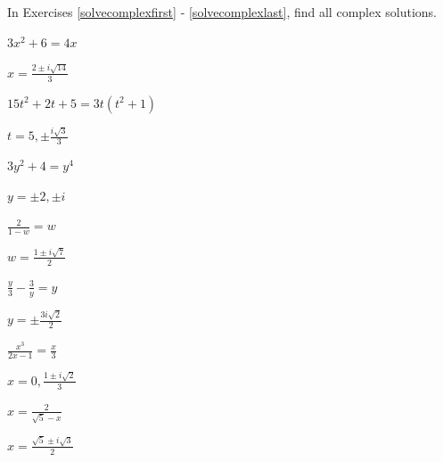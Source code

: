 \documentclass{ximera}
\begin{document}
\begin{question}

In Exercises \ref{solvecomplexfirst} - \ref{solvecomplexlast}, find all complex solutions.

\begin{problem} \label{solvecomplexfirst}
$3x^2 + 6 = 4x$

\begin{solution}
$x = \frac{2 \pm i\sqrt{14}}{3}$ 
\end{solution}
\end{problem}

\begin{problem}
$15t^2+2t+5= 3t(t^2+1)$

\begin{solution}
 $t = 5, \pm \frac{i \sqrt{3}}{3}$
\end{solution}
\end{problem}

\begin{problem}
$3y^2 + 4 = y^4$

\begin{solution}
 $y = \pm 2, \pm i$
\end{solution}
\end{problem}

\begin{problem}
$\frac{2}{1-w}= w$ 

\begin{solution}
 $w = \frac{1 \pm i \sqrt{7}}{2}$ 
\end{solution}
\end{problem}

\begin{problem}
$\frac{y}{3} - \frac{3}{y} = y$ 

\begin{solution}
$y = \pm \frac{3i \sqrt{2}}{2}$
\end{solution}
\end{problem}

\begin{problem}
$\frac{x^3}{2x-1} = \frac{x}{3}$

\begin{solution}
 $x= 0, \frac{1 \pm i\sqrt{2}}{3}$ 
\end{solution}
\end{problem}

\begin{problem}
$x =\frac{2}{\sqrt{5} - x}$

\begin{solution}
 $x = \frac{\sqrt{5} \pm i\sqrt{3}}{2}$
\end{solution}
\end{problem}


\end{question}
\end{document}
